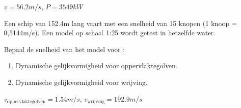 	\begin{antwoord}
		$v = 56.2\unit{m/s}$, $P = 3549\unit{kW}$
	\end{antwoord}
\begin{toepassing}[*]
	\label{schip}
Een schip van 152.4\unit{m} lang vaart met een snelheid van 15 knopen (1 knoop = 0,5144m/s). Een model op schaal 1:25 wordt getest in hetzelfde water.

Bepaal de snelheid van het model voor :
	\begin{enumerate}
		\item Dynamische gelijkvormigheid voor oppervlaktegolven.
		\item Dynamische gelijkvormigheid voor wrijving.
	\end{enumerate}
\end{toepassing}
\begin{antwoord}
	$v_{\text{oppervlaktegolven}} = 1.54\unit{m/s}$, $v_{\text{wrijving}} = 192.9\unit{m/s}$
\end{antwoord}
